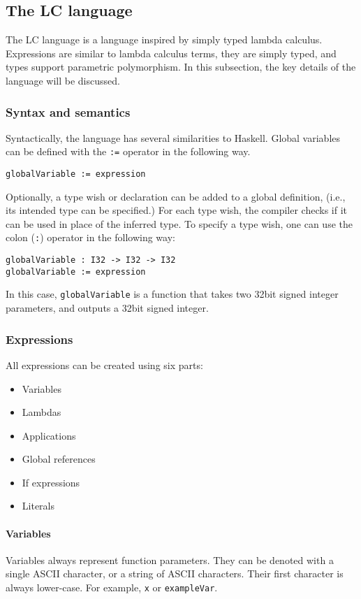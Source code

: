 \documentclass[12pt]{article}
\begin{document}
\subsection{The LC language}

The LC language is a language inspired by simply typed lambda calculus.
Expressions are similar to lambda calculus terms, they are simply typed, and
types support parametric polymorphism. In this subsection, the key details of
the language will be discussed.

\subsubsection{Syntax and semantics}

Syntactically, the language has several similarities to Haskell. Global
variables can be defined with the \texttt{:=} operator in the following way.
\begin{lstlisting}
globalVariable := expression
\end{lstlisting}
Optionally, a type wish or declaration can be added to a global definition,
(i.e., its intended type can be specified.) For each type wish, the compiler
checks if it can be used in place of the inferred type. To specify a type wish,
one can use the colon (\verb$:$) operator in the following way:
\begin{lstlisting}
globalVariable : I32 -> I32 -> I32
globalVariable := expression
\end{lstlisting}
In this case, \verb$globalVariable$ is a function that takes two 32bit signed
integer parameters, and outputs a 32bit signed integer.

\subsubsection{Expressions}

All expressions can be created using six parts:
\begin{itemize}
    \item Variables
    \item Lambdas
    \item Applications
    \item Global references
    \item If expressions
    \item Literals
\end{itemize}

\paragraph{Variables} Variables always represent function parameters. They can
be denoted with a single ASCII character, or a string of ASCII characters. Their
first character is always lower-case. For example, \verb$x$ or \verb$exampleVar$.
\end{document}
